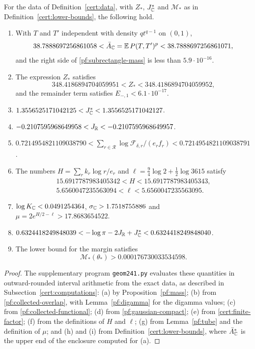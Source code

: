 \begin{proposition}\label{cert:enclosures}
For the data of Definition~\ref{cert:data}, with $Z_*$, $J_\mathbb C^*$ and
$\mathcal M_*$ as in Definition~\ref{cert:lower-bounds}, the following
hold.
\begin{enumerate}
\item[(a)] With $T$ and $T'$ independent with density $qt^{q-1}$ on
$(0,1)$,
\begin{equation}\label{cert:mass}
 38.7888697256861058<\bar A_\mathbb C=\mathbb E\,P(T,T')^p<38.7888697256861071 ,
\end{equation}
and the right side of \eqref{pf:subrectangle-mass} is less than
$5.9\cdot10^{-16}$.
\item[(b)] The expression $Z_*$ satisfies
\begin{equation}\label{cert:overlap}
 348.4186894704059951<Z_*<348.4186894704059952 ,
\end{equation}
and the remainder term satisfies $E_{-,1}<6.1\cdot10^{-17}$.
\item[(c)] $1.3556525171042125<J_\mathbb C^*<1.3556525171042127$.
\item[(d)] $-0.2107595968649958<J_\mathbb R<-0.2107595968649957$.
\item[(e)] $0.7214954821109038790<\sum_{r\in\mathcal R}\log\mathcal
F_{\delta,r}/(e_rf_r)<0.7214954821109038791$.
\item[(f)] The numbers $H=\sum_rk_r\log r/e_r$ and
$\ell=\frac94\log2+\frac12\log3615$ satisfy
\begin{gather*}
 15.6917787983405342<H<15.6917787983405343,\\
 5.6560047235563094<\ell<5.6560047235563095 .
\end{gather*}
\item[(g)] $\log K_\mathbb C<0.0491254364$, $\sigma_\mathbb C>1.7518755886$ and
$\mu=2e^{H/2-\ell}>17.8683654522$.
\item[(h)] $0.6324418249848039<-\log\pi-2J_\mathbb R+J_\mathbb C^*<0.6324418249848040$.
\item[(i)] The lower bound for the margin satisfies
\begin{equation}\label{cert:margin}
 \mathcal M_*(\theta_*)>0.000176730033534598 .
\end{equation}
\end{enumerate}
\end{proposition}

\begin{proof}
The supplementary program \texttt{geom241.py} evaluates these
quantities in outward-rounded interval arithmetic from the exact data,
as described in Subsection~\ref{cert:computations}: (a) by
Proposition~\ref{pf:mass}; (b) from \eqref{pf:collected-overlap}, with
Lemma~\ref{pf:digamma} for the digamma values; (c) from
\eqref{pf:collected-functional}; (d) from \eqref{pf:gaussian-compact};
(e) from \eqref{cert:finite-factor}; (f) from the definitions of $H$ and
$\ell$; (g) from Lemma~\ref{pf:tube} and the definition of $\mu$; and
(h) and (i) from Definition~\ref{cert:lower-bounds}, where
$\bar A_\mathbb C^*$ is the upper end of the enclosure computed for (a).
\end{proof}

